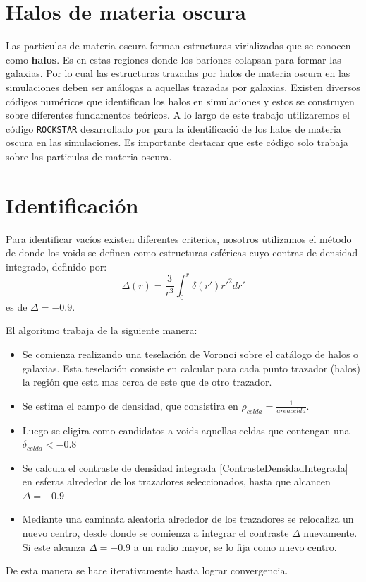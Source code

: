 \section{Halos de materia oscura}

Las particulas de materia oscura forman estructuras virializadas que se conocen como \textbf{halos}. Es en estas regiones donde los bariones colapsan para formar las galaxias. Por lo cual las estructuras trazadas por halos de materia oscura en las simulaciones deben ser an\'alogas a aquellas trazadas por galaxias. Existen diversos c\'odigos num\'ericos que identifican los halos en simulaciones y estos se construyen sobre diferentes fundamentos te\'oricos. A lo largo de este trabajo utilizaremos el c\'odigo \texttt{ROCKSTAR} desarrollado por \citet{Rockstar}  para la identificaci\'o de los halos de materia oscura en las simulaciones. Es importante destacar que este c\'odigo solo trabaja sobre las particulas de materia oscura. 


\section{Identificaci\'on}

Para identificar vac\'ios existen diferentes criterios, nosotros utilizamos el m\'etodo de \citep{Ruiz2015} donde los voids se definen como estructuras esf\'ericas cuyo contras de densidad integrado, definido por:
\begin{equation}
    \Delta(r)=\frac{3}{r^{3}}\int_ {0}^{r}\delta(r')r'^{2}dr'
    \label{ContrasteDensidadIntegrada}
\end{equation}{}
es de $\Delta=-0.9$.

El algoritmo trabaja de la siguiente manera:
\begin{itemize}
    \item Se comienza realizando una teselaci\'on de Voronoi sobre el cat\'alogo de halos o galaxias. Esta teselaci\'on consiste en calcular para cada punto trazador (halos) la regi\'on que esta mas cerca de este que de otro trazador.
    \item Se estima el campo de densidad, que consistira en $\rho_{celda}=\frac{1}{area celda}$. 
    \item Luego se eligira como candidatos a voids aquellas celdas que contengan una $\delta_ {celda}<-0.8$
    \item Se calcula el contraste de densidad integrada \ref{ContrasteDensidadIntegrada} en esferas alrededor de los trazadores seleccionados, hasta que alcancen $\Delta=-0.9$
    \item Mediante una caminata aleatoria alrededor de los trazadores se relocaliza un nuevo centro, desde donde se comienza a integrar el contraste $\Delta$ nuevamente. Si este alcanza $\Delta=-0.9$ a un radio mayor, se lo fija como nuevo centro.
    
\end{itemize}{}
De esta manera se hace iterativamente hasta lograr convergencia. 